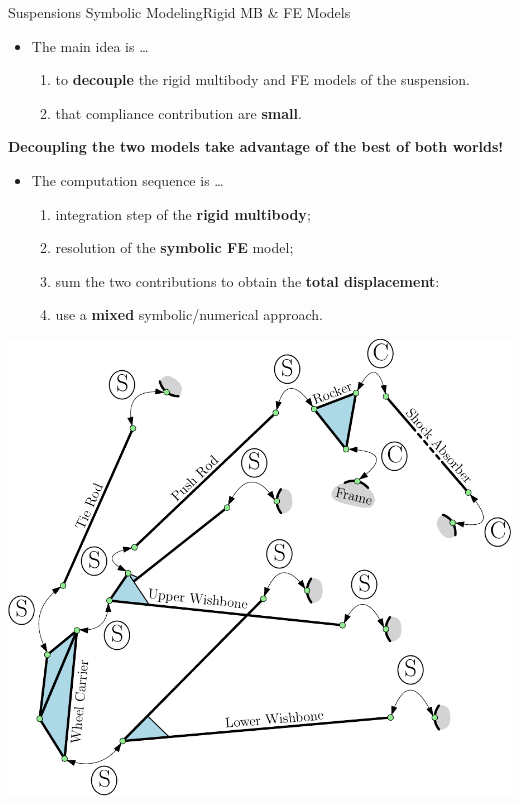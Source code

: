 \begin{frame}{Suspensions Symbolic Modeling}{Rigid \acs{MB} \& \acs{FE} Models}
  \begin{minipage}[c]{0.55\linewidth}
    \begin{itemize}
      \item The main idea is \dots
      \begin{enumerate}
        \item to \textbf{decouple} the rigid multibody and \acs{FE} models of the suspension.
        \item that compliance contribution are \textbf{small}.
      \end{enumerate}
    \end{itemize}
    \begin{center}\begin{minipage}{7.0cm}\begin{block}{}
      \centering
      \textcolor{fg_sl_color}{\textbf{Decoupling the two models take advantage of the best of both worlds!}}
    \end{block}\end{minipage}\vspace{1.0em}\end{center}
    \begin{itemize}
      \item The computation sequence is \dots
      \begin{enumerate}
        \item integration step of the \textbf{rigid multibody};
        \item resolution of the \textbf{symbolic \acs{FE}} model;
        \item sum the two contributions to obtain the \textbf{total displacement}:
        \item  use a \textbf{mixed} symbolic/numerical approach.
      \end{enumerate}
    \end{itemize}
  \end{minipage}
  \begin{minipage}[c]{0.40\linewidth}
    \includegraphics[width=1.0\textwidth]{./figures/constraints.pdf}

\end{minipage}
\end{frame}
